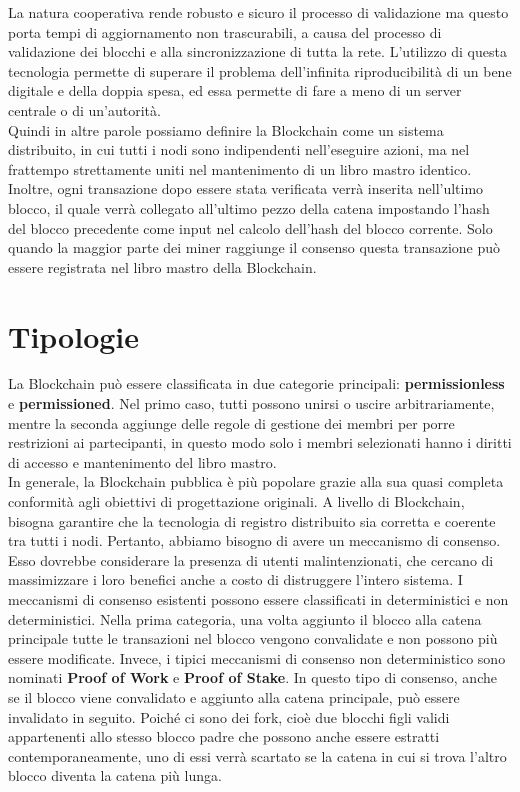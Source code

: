 \documentclass[a4paper,11pt]{report}
\begin{document}
\newpage
La natura cooperativa rende robusto e sicuro il processo di validazione ma questo porta tempi di aggiornamento non trascurabili, a causa del processo di validazione dei blocchi e alla sincronizzazione di tutta la rete. L'utilizzo di questa tecnologia permette di superare il problema dell'infinita riproducibilità di un bene digitale e della doppia spesa, ed essa permette di fare a meno di un server centrale o di un'autorità.\\
Quindi in altre parole possiamo definire la Blockchain come un sistema distribuito, in cui tutti i nodi sono indipendenti nell'eseguire azioni, ma nel frattempo strettamente uniti nel mantenimento di un libro mastro identico.\\
Inoltre, ogni transazione dopo essere stata verificata verrà inserita nell'ultimo blocco, il quale verrà collegato all'ultimo pezzo della catena impostando l'hash del blocco precedente come input nel calcolo dell'hash del blocco corrente. Solo quando la maggior parte dei miner raggiunge il consenso questa transazione può essere registrata nel libro mastro della Blockchain.\\ 
\newpage
\section{Tipologie}

La Blockchain può essere classificata in due categorie principali: \textbf{permissionless} e \textbf{permissioned}. Nel primo caso, tutti possono unirsi o uscire arbitrariamente, mentre la seconda aggiunge delle regole di gestione dei membri per porre restrizioni ai partecipanti, in questo modo solo i membri selezionati hanno i diritti di accesso e mantenimento del libro mastro. \\
In generale, la Blockchain pubblica è più popolare grazie alla sua quasi completa conformità agli obiettivi di progettazione originali.
A livello di Blockchain, bisogna garantire che la tecnologia di registro distribuito sia corretta e coerente tra tutti i nodi. Pertanto, abbiamo bisogno di avere un meccanismo di consenso. Esso dovrebbe considerare la presenza di utenti malintenzionati, che cercano di massimizzare i loro benefici anche a costo di distruggere l'intero sistema. I meccanismi di consenso esistenti possono essere classificati in deterministici e non deterministici. Nella prima categoria, una volta aggiunto il blocco alla catena principale tutte le transazioni nel blocco vengono convalidate e non possono più essere modificate. Invece, i tipici meccanismi di consenso non deterministico sono nominati \textbf{Proof of Work} e \textbf{Proof of Stake}. In questo tipo di consenso, anche se il blocco viene convalidato e aggiunto alla catena principale, può essere invalidato in seguito. Poiché ci sono dei fork, cioè due blocchi figli validi appartenenti allo stesso blocco padre che possono anche essere estratti contemporaneamente, uno di essi verrà scartato se la catena in cui si trova l'altro blocco diventa la catena più lunga.
\end{document}
